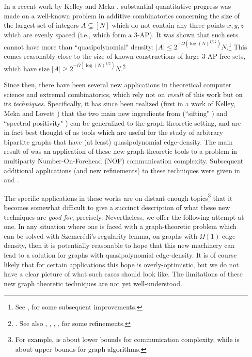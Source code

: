 \documentclass[11pt]{article}
\newcommand{\1}{ \mathbbm{1}}
\begin{document}
In a recent work by Kelley and Meka \cite{KelleyM2023strong}, substantial quantitative progress was made on a well-known problem in additive combinatorics concerning the size of the largest set of integers $A \subseteq [N]$ which do not contain any three points $x,y,z$ which are evenly spaced (i.e., which form a $3$-AP). It was shown that such sets cannot have more than ``quasipolynomial" density: 
$|A| \leq 2^{-\Omega(\log(N)^{1/12})} N$.\footnote{See \cite{bloom2023kelley}, \cite{bloom2023improvement} for some subsequent improvements. }
This comes reasonably close to the size of known constructions of large $3$-AP free sets, which have size $|A| \geq 2^{-\Omega(\log(N)^{1/2})} N$.\footnote{
\cite{behrend46}. See also \cite{elkin2010improved}, \cite{gw10}, \cite{obryant11}, \cite{hunter2024new}, \cite{elsholtz2024improving} for some refinements.}

Since then, there have been several new applications in theoretical computer science and extremal combinatorics, which rely not on \textit{result} of this work but on its \textit{techniques}. 
Specifically, it has since been realized (first in a work of Kelley, Meka and Lovett \cite{KelleyLM2024-nof}) that the two main new ingredients from \cite{KelleyM2023strong} (``sifting" \cite[Section 4]{KelleyM2023strong}) and ``spectral positivity" \cite[Section 5]{KelleyM2023strong}) can be generalized to the graph theoretic setting, and are in fact best thought of as tools which are useful for the study of arbitrary bipartite graphs that have (at least) quasipolynomial edge-density. The main result of \cite{KelleyLM2024-nof} was an application of these new graph-theoretic tools to a problem in multiparty Number-On-Forehead (NOF) communication complexity. Subsequent additional applications (and new refinements) to these techniques were given in \cite{abboud2024new} and \cite{filmus2024sparse}. 

The specific applications in these works are on distant enough topics\footnote{For example, \cite{KelleyLM2024-nof} is about lower bounds for communication complexity, while \cite{abboud2024new} is about upper bounds for graph algorithms.} that it becomes somewhat difficult to give a succinct description of what these new techniques are \textit{good for}, precisely. Nevertheless, we offer the following attempt at one. In any situation where one is faced with a graph-theoretic problem which can be solved with Szemerédi's regularity lemma, on graphs with $\Omega(1)$ edge-density, then it is potentially reasonable to hope that this new machinery can lead to a solution for graphs with quasipolynomial edge-density. It is of course likely that for certain applications this hope is overly-optimistic, but we do not have a clear picture of what such cases should look like. The limitations of these new graph theoretic techniques are not yet well-understood.
\end{document}
